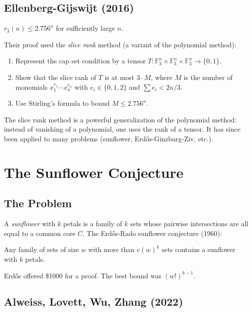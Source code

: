 \subsection{Ellenberg-Gijswijt (2016)}

\begin{theorem}
$r_3(n) \le 2.756^n$ for sufficiently large $n$.
\end{theorem}

Their proof used the \emph{slice rank} method (a variant of the polynomial method):
\begin{enumerate}
\item Represent the cap set condition by a tensor $T: \mathbb{F}_3^n \times \mathbb{F}_3^n \times \mathbb{F}_3^n \to \{0,1\}$.
\item Show that the slice rank of $T$ is at most $3 \cdot M$, where $M$ is the number of monomials $x_1^{e_1} \cdots x_n^{e_n}$ with $e_i \in \{0,1,2\}$ and $\sum e_i < 2n/3$.
\item Use Stirling's formula to bound $M \le 2.756^n$.
\end{enumerate}

\begin{highlightbox}
The slice rank method is a powerful generalization of the polynomial method: instead of vanishing of a polynomial, one uses the rank of a tensor. It has since been applied to many problems (sunflower, Erdős-Ginzburg-Ziv, etc.).
\end{highlightbox}

\section{The Sunflower Conjecture}

\subsection{The Problem}
A \emph{sunflower} with $k$ petals is a family of $k$ sets whose pairwise intersections are all equal to a common core $C$. The Erdős-Rado sunflower conjecture (1960):

\begin{conjecture}
Any family of sets of size $w$ with more than $c(w)^k$ sets contains a sunflower with $k$ petals.
\end{conjecture}

Erdős offered \$1000 for a proof. The best bound was $(w!)^{k-1}$.

\subsection{Alweiss, Lovett, Wu, Zhang (2022)}

